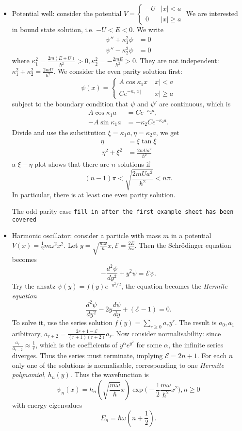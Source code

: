 \documentclass[a4paper]{article}
\theoremstyle{definition}
\begin{document}
\begin{eg}
\begin{itemize}
\item Potential well: consider the potential \(V=
  \begin{cases}
    -U & |x| < a \\
    0 & |x| \geq a
  \end{cases}
  \) We are interested in bound state solution, i.e. \(-U < E < 0\). We write
  \begin{align*}
    \psi'' + \kappa_1^2\psi &= 0 \\
    \psi'' - \kappa_2^2\psi &= 0
  \end{align*}
  where \(\kappa_1^2 = \frac{2m(E+U)}{\hbar^2}>0, \kappa_2^2= -\frac{2mE}{\hbar^2}>0\). They are not independent: \(\kappa_1^2+\kappa_2^2 = \frac{2mU}{\hbar^2}\). We consider the even parity solution first:
  \[
    \psi(x) =
    \begin{cases}
      A\cos \kappa_1 x & |x| < a \\
      Ce^{-\kappa_2|x|} & |x| \geq a
    \end{cases}
  \]
  subject to the boundary condition that \(\psi\) and \(\psi'\) are continuous, which is
  \begin{align*}
    A\cos \kappa_1 a &= Ce^{-\kappa_2a}, \\
    -A\sin \kappa_1 a &= -\kappa_2 Ce^{-\kappa_2a}.
  \end{align*}
  Divide and use the substitution \(\xi=\kappa_1a, \eta = \kappa_2a\), we get
  \begin{align*}
    \eta &= \xi\tan\xi \\\
    \eta^2 + \xi^2 &= \frac{2mUa^2}{\hbar^2}
  \end{align*}
  a \(\xi-\eta\) plot shows that there are \(n\) solutions if
  \[
    (n-1)\pi < \sqrt{\frac{2mUa^2}{\hbar^2}} < n\pi.
  \]
  In particular, there is at least one even parity solution.

  The odd parity case \texttt{fill in after the first example sheet has been covered}
\item Harmonic oscillator: consider a particle with mass \(m\) in a potential \(V(x) = \frac{1}{2}m\omega^2x^2\). Let \(y=\sqrt{\frac{m\omega}{\hbar}}x, \mathcal{E} = \frac{2E}{\hbar\omega}\). Then the Schr\"odinger equation becomes
  \[
    -\frac{d^2\psi}{dy^2} + y^2\psi = \mathcal{E} \psi.
  \]
  Try the ansatz \(\psi(y) = f(y) e^{-y^2/2}\), the equation becomes the \emph{Hermite equation}
  \[
    \frac{d^2\psi}{dy^2} - 2y \frac{d\psi}{dy} + (\mathcal{E}-1) =0.
  \]
  To solve it, use the series solution \(f(y) = \sum_{r\geq0}a_ry^r\). The result is \(a_0,a_1\) aribitrary, \(a_{r+2} =\frac{2r+1-\mathcal{E}}{(r+1)(r+2)}a_r\). Now consider normalisability: since \(\frac{a_r}{a_{r-2}}\approx \frac{1}{r}\), which is the coefficients of \(y^\alpha e^{y^2}\) for some \(\alpha\), the infinite series diverges. Thus the series must terminate, implying \(\mathcal{E}=2n+1\). For each \(n\) only one of the solutions is normalisable, corresponding to one \emph{Hermite polynomial}, \(h_n(y)\). Thus the wavefunction is
  \[
    \psi_n(x) = h_n(\sqrt{\frac{m\omega}{\hbar}}x)\exp \Big( -\frac{1}{2}\frac{m\omega}{\hbar^2}x^2 \Big), n\geq0
  \]
  with energy eigenvalues
  \[
    E_n=\hbar\omega(n+\frac{1}{2}).
  \]
  

\end{itemize}
\end{eg}
\end{document}
